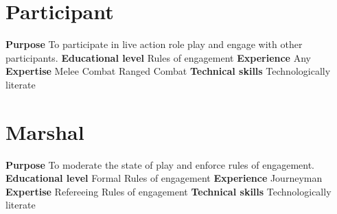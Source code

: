 \section{Participant}
\textbf{Purpose}\newline
To participate in live action role play and engage with other participants.
\newline\newline
\textbf{Educational level} \newline
Rules of engagement
\newline\newline
\textbf{Experience}\newline
Any
\newline\newline
\textbf{Expertise}\newline
Melee Combat
\newline
Ranged Combat
\newline\newline
\textbf{Technical skills}\newline
Technologically literate
\newline\newline

\section{Marshal}
\textbf{Purpose}\newline
To moderate the state of play and enforce rules of engagement.
\newline\newline
\textbf{Educational level} \newline
Formal Rules of engagement
\newline\newline
\textbf{Experience}\newline
Journeyman
\newline\newline
\textbf{Expertise}\newline
Refereeing
\newline
Rules of engagement
\newline\newline
\textbf{Technical skills}\newline
Technologically literate
\newline\newline

